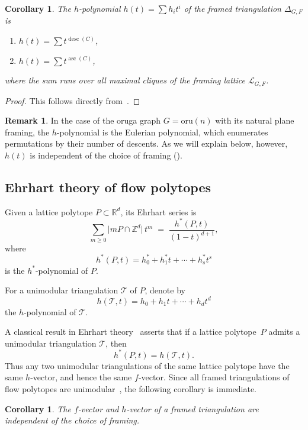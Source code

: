 \documentclass[12pt, reqno]{amsart}
\newcommand{\asc}{\operatorname{asc}}
\newcommand{\desc}{\operatorname{desc}}
\theoremstyle{plain}
\newtheorem{corollary}[theorem]{Corollary}
\theoremstyle{definition}
\newtheorem{remark}[theorem]{Remark}
\numberwithin{equation}{section}
\newcommand\scrL{\mathscr{L}}
\newcommand{\oru}[1]{\mathrm{oru}(#1)}
\begin{document}
\begin{corollary}\label{cor_hPolynomial_desc_asc}
    The $h$-polynomial $h(t)=\sum h_i t^i$ of the framed triangulation $\Delta_{G,F}$ is
    \begin{enumerate}
        \item $h(t)= \sum t^{\desc(C)}$,
        \item $h(t)= \sum t^{\asc(C)}$,
    \end{enumerate}
    where the sum runs over all maximal cliques of the framing lattice $\scrL_{G,F}$.
\end{corollary}
\begin{proof}
    This follows directly from~.
\end{proof}

\begin{remark}
    In the case of the oruga graph $G=\oru{n}$ with its natural plane framing, the $h$-polynomial is the Eulerian polynomial, which enumerates permutations by their number of descents. As we will explain below, however, $h(t)$ is independent of the choice of framing ().
\end{remark}

\subsection{Ehrhart theory of flow polytopes}\label{sec_Ehrhart}
Given a lattice polytope \( P \subset \mathbb{R}^d \), its Ehrhart series is
\[
\sum_{m \ge 0} \lvert mP \cap \mathbb{Z}^d \rvert \, t^m
\;=\;
\frac{h^*(P,t)}{(1-t)^{d+1}},
\]
where
\[
h^*(P,t) = h_0^* + h_1^* t + \cdots + h_s^* t^s
\]
is the \(h^*\)-polynomial of \(P\).

For a unimodular triangulation \(\mathcal{T}\) of \(P\), denote by
\[
h(\mathcal{T}, t) = h_0 + h_1 t + \cdots + h_d t^d
\]
the \(h\)-polynomial of \(\mathcal{T}\).


A classical result in Ehrhart theory~\cite[Theorem 10.3]{beck_computing_2015} asserts that if a lattice polytope~$P$ admits a unimodular triangulation $\mathcal{T}$, then
\[
h^*(P,t) = h(\mathcal{T}, t).
\]
Thus any two unimodular triangulations of the same lattice polytope have the same \(h\)-vector, and hence the same \(f\)-vector. Since all framed triangulations of flow polytopes are unimodular~\cite{dkktriangulation}, the following corollary is immediate.

\begin{corollary}\label{cor_fvector_hvector_framingIndependent}
The \(f\)-vector and \(h\)-vector of a framed triangulation are independent of the choice of framing.
\end{corollary}
\end{document}
